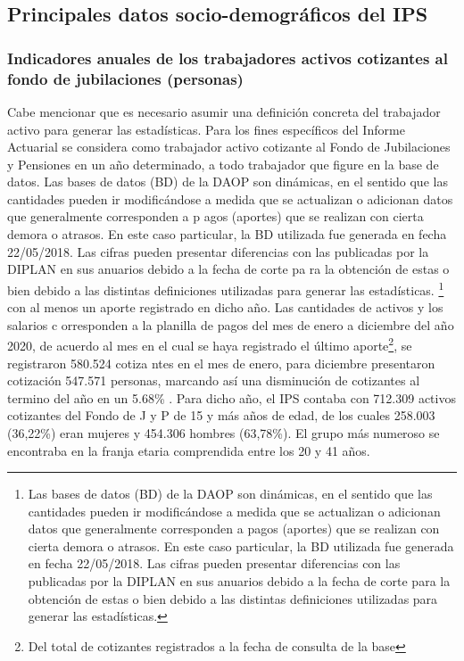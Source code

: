 \newpage

\subsection{Principales datos socio-demográficos del IPS}

\subsubsection{Indicadores anuales de los trabajadores activos cotizantes al fondo de jubilaciones (personas)}

Cabe mencionar que es necesario asumir una definición concreta del
trabajador activo para generar las estadísticas. Para los fines
específicos del Informe Actuarial se considera como trabajador activo
cotizante al Fondo de Jubilaciones y Pensiones en un año determinado, a
todo trabajador que figure en la base de datos. Las bases de datos (BD)
de la DAOP son dinámicas, en el sentido que las cantidades pueden ir
modificándose a medida que se actualizan o adicionan datos que
generalmente corresponden a p agos (aportes) que se realizan con cierta
demora o atrasos. En este caso particular, la BD utilizada fue generada
en fecha 22/05/2018. Las cifras pueden presentar diferencias con las
publicadas por la DIPLAN en sus anuarios debido a la fecha de corte pa
ra la obtención de estas o bien debido a las distintas definiciones
utilizadas para generar las estadísticas.
\footnote{Las bases de datos (BD) de la DAOP son dinámicas, en el sentido que las cantidades pueden ir modificándose a medida que se actualizan
 o adicionan datos que generalmente corresponden a pagos (aportes) que se realizan con cierta demora o atrasos. En este caso particular, la BD utilizada fue generada en fecha 22/05/2018. Las cifras pueden presentar diferencias con las publicadas por la 
DIPLAN en sus anuarios debido a la fecha de corte para la obtención de estas o bien debido a las distintas definiciones utilizadas para generar las estadísticas.}
con al menos un aporte registrado en dicho año. Las cantidades de
activos y los salarios c orresponden a la planilla de pagos del mes de
enero a diciembre del año 2020, de acuerdo al mes en el cual se haya
registrado el último
aporte\footnote{Del total de cotizantes registrados a la fecha de consulta de la base},
se registraron 580.524 cotiza ntes en el mes de enero, para diciembre
presentaron cotización 547.571 personas, marcando así una disminución de
cotizantes al termino del año en un 5.68\% . Para dicho año, el IPS
contaba con 712.309 activos cotizantes del Fondo de J y P de 15 y más
años de edad, de los cuales 258.003 (36,22\%) eran mujeres y 454.306
hombres (63,78\%). El grupo más numeroso se encontraba en la franja
etaria comprendida entre los 20 y 41 años.

